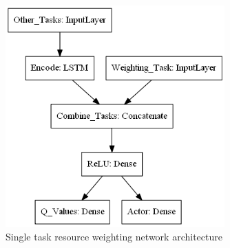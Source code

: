 \begin{figure}[h]
    \centering
    \includegraphics[width=0.75\textwidth]{figures/3_solution_figs/single_task_weighting_network_architecture.png}
    \caption{Single task resource weighting network architecture}
    \label{fig:resource-weighting-network-architecture}
\end{figure}


